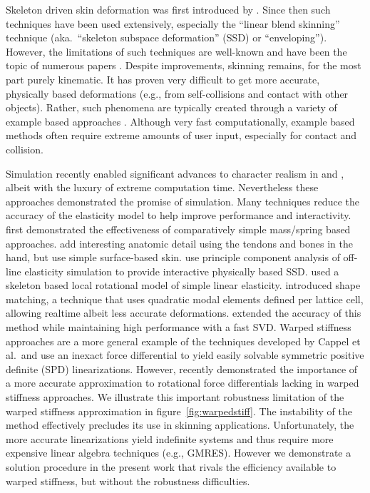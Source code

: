 



Skeleton driven skin deformation was first introduced by \cite{Magnenat-Thalmann89}. Since then such techniques have been used extensively, especially the ``linear blend skinning'' technique (aka.\ ``skeleton subspace deformation'' (SSD) or ``enveloping''). However, the limitations of such techniques are well-known and have been the topic of numerous papers \cite{Wang02,Merry06,Kavan08}. Despite improvements, skinning remains, for the most part purely kinematic. It has proven very difficult to get more accurate, physically based deformations (e.g., from self-collisions and contact with other objects). Rather, such phenomena are typically created through a variety of example based approaches \cite{Lewis00,Sloan01}. Although very fast computationally, example based methods often require extreme amounts of user input, especially for contact and collision.

Simulation recently enabled significant advances to character realism in \cite{Irving:2008:SDF} and \cite{clutterbuck:2010:avatar}, albeit with the luxury of extreme computation time. Nevertheless these approaches demonstrated the promise of simulation. Many techniques reduce the accuracy of the elasticity model to help improve performance and interactivity. \cite{Waters90,Chadwick89} first demonstrated the effectiveness of comparatively simple mass/spring based approaches. \cite{Sueda:2008} add interesting anatomic detail using the tendons and bones in the hand, but use simple surface-based skin. \cite{Kry02} use principle component analysis of off-line elasticity simulation to provide interactive physically based SSD. \cite{capell:2005:pb,Capell:2002:ISD:566570.566622,Galopo07} used a skeleton based local rotational model of simple linear elasticity. \cite{Muller:2005:MDB} introduced shape matching, a technique that uses quadratic modal elements defined per lattice cell, allowing realtime albeit less accurate deformations. \cite{Rivers:2007:FFL} extended the accuracy of this
method while maintaining high performance with a fast SVD. Warped stiffness approaches \cite{Muller:2002:SRD,Muller:2004:IVM} are a more general example of the techniques developed by Cappel et al.\ and use an inexact force differential to yield easily solvable symmetric positive definite (SPD) linearizations. However, \cite{Chao:2010:SGM} recently demonstrated the importance of a more accurate approximation to rotational force differentials lacking in warped stiffness approaches. We  illustrate this important robustness limitation of the warped stiffness approximation in figure~\ref{fig:warpedstiff}. The instability of the method effectively precludes its use in skinning applications. Unfortunately, the more accurate linearizations  yield indefinite systems and thus require more expensive linear algebra techniques (e.g., GMRES). However we demonstrate a solution procedure in the present work that rivals the efficiency available to warped stiffness, but without the robustness difficulties.

